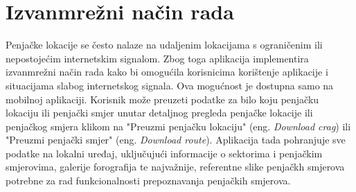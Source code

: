 \section{Izvanmrežni način rada}

Penjačke lokacije se često nalaze na udaljenim lokacijama s ograničenim ili nepostojećim internetskim signalom. Zbog toga aplikacija implementira izvanmrežni način rada kako bi omogućila korisnicima korištenje aplikacije i situacijama slabog internetskog signala. Ova mogućnost je dostupna samo na mobilnoj aplikaciji. Korisnik može preuzeti podatke za bilo koju penjačku lokaciju ili penjački smjer unutar detaljnog pregleda penjačke lokacije ili penjačkog smjera klikom na "Preuzmi penjačku lokaciju" (eng. \textit{Download crag}) ili "Preuzmi penjački smjer" (eng. \textit{Download route}). Aplikacija tada pohranjuje sve podatke na lokalni uređaj, uključujući informacije o sektorima i penjačkim smjerovima, galerije forografija te najvažnije, referentne slike penjačkh smjerova potrebne za rad funkcionalnosti prepoznavanja penjačkih smjerova.

